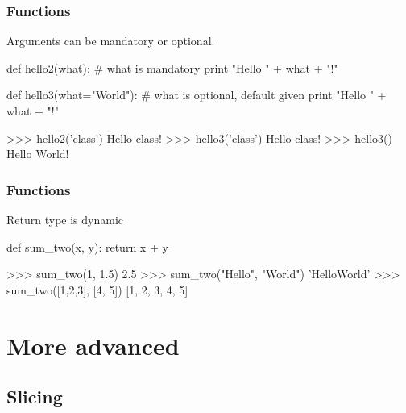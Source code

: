 \documentclass[xetex,10pt]{beamer}
\begin{document}
\begin{frame}[fragile]
	\frametitle{Functions}

	Arguments can be mandatory or optional.
	
\begin{python}
def hello2(what):			# what is mandatory
    print "Hello " + what + "!"

def hello3(what="World"):	# what is optional, default given
    print "Hello " + what + "!"
\end{python}

	\vspace*{1em}

\begin{python}
>>> hello2('class')
Hello class!
>>> hello3('class')
Hello class!
>>> hello3()
Hello World!
\end{python}
\end{frame}

\begin{frame}[fragile]
	\frametitle{Functions}
	Return type is dynamic

\begin{python}
def sum_two(x, y):
    return x + y
\end{python}

	\vspace*{1em}

\begin{python}
>>> sum_two(1, 1.5)
2.5
>>> sum_two("Hello", "World")
'HelloWorld'
>>> sum_two([1,2,3], [4, 5])
[1, 2, 3, 4, 5]
\end{python}

\end{frame}

\section{More advanced}

\subsection{Slicing}
\end{document}
